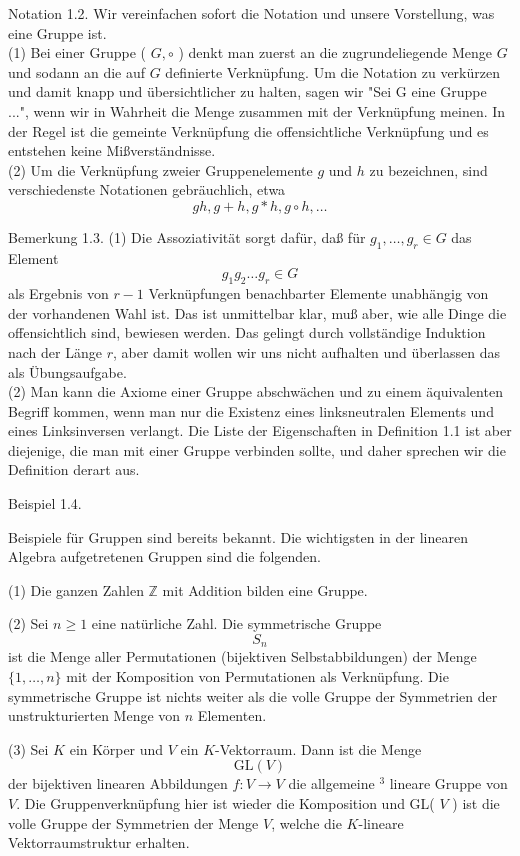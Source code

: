 \documentclass[10pt, letterpaper]{article}
\begin{document}
Notation 1.2. Wir vereinfachen sofort die Notation und unsere Vorstellung, was eine Gruppe ist.\\
(1) Bei einer Gruppe ( $G, \circ$ ) denkt man zuerst an die zugrundeliegende Menge $G$ und sodann an die auf $G$ definierte Verknüpfung. Um die Notation zu verkürzen und damit knapp und übersichtlicher zu halten, sagen wir "Sei G eine Gruppe ...", wenn wir in Wahrheit die Menge zusammen mit der Verknüpfung meinen. In der Regel ist die gemeinte Verknüpfung die offensichtliche Verknüpfung und es entstehen keine Mißverständnisse.\\
(2) Um die Verknüpfung zweier Gruppenelemente $g$ und $h$ zu bezeichnen, sind verschiedenste Notationen gebräuchlich, etwa
$$
g h, g+h, g * h, g \circ h, \ldots
$$

Bemerkung 1.3. (1) Die Assoziativität sorgt dafür, daß für $g_{1}, \ldots, g_{r} \in G$ das Element
$$
g_{1} g_{2} \ldots g_{r} \in G
$$
als Ergebnis von $r-1$ Verknüpfungen benachbarter Elemente unabhängig von der vorhandenen Wahl ist. Das ist unmittelbar klar, muß aber, wie alle Dinge die offensichtlich sind, bewiesen werden. Das gelingt durch vollständige Induktion nach der Länge $r$, aber damit wollen wir uns nicht aufhalten und überlassen das als Übungsaufgabe.\\


(2) Man kann die Axiome einer Gruppe abschwächen und zu einem äquivalenten Begriff kommen, wenn man nur die Existenz eines linksneutralen Elements und eines Linksinversen verlangt. Die Liste der Eigenschaften in Definition 1.1 ist aber diejenige, die man mit einer Gruppe verbinden sollte, und daher sprechen wir die Definition derart aus.

Beispiel 1.4. 

Beispiele für Gruppen sind bereits bekannt. Die wichtigsten in der linearen Algebra aufgetretenen Gruppen sind die folgenden.


(1) Die ganzen Zahlen $\mathbb{Z}$ mit Addition bilden eine Gruppe.


(2) Sei $n \geq 1$ eine natürliche Zahl. Die symmetrische Gruppe
$$
S_{n}
$$
ist die Menge aller Permutationen (bijektiven Selbstabbildungen) der Menge $\{1, \ldots, n\}$ mit der Komposition von Permutationen als Verknüpfung. Die symmetrische Gruppe ist nichts weiter als die volle Gruppe der Symmetrien der unstrukturierten Menge von $n$ Elementen.

(3) Sei $K$ ein Körper und $V$ ein $K$-Vektorraum. Dann ist die Menge
$$
\mathrm{GL}(V)
$$
der bijektiven linearen Abbildungen $f: V \rightarrow V$ die allgemeine ${ }^{3}$ lineare Gruppe von $V$. Die Gruppenverknüpfung hier ist wieder die Komposition und GL( $V$ ) ist die volle Gruppe der Symmetrien der Menge $V$, welche die $K$-lineare Vektorraumstruktur erhalten.
\end{document}

